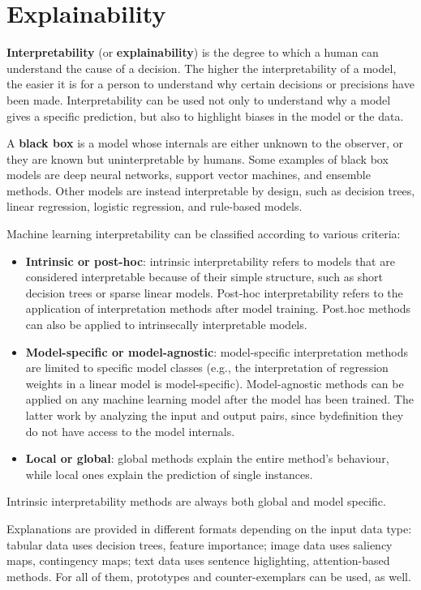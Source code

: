 \chapter{Explainability}

\textbf{Interpretability} (or \textbf{explainability}) is the degree to which a human can understand the cause of a decision. The higher the interpretability of a model, the easier it is for a person to understand why certain decisions or precisions have been made. Interpretability can be used not only to understand why a model gives a specific prediction, but also to highlight biases in the model or the data.

A \textbf{black box} is a model whose internals are either unknown to the observer, or they are known but uninterpretable by humans. Some examples of black box models are deep neural networks, support vector machines, and ensemble methods. Other models are instead interpretable by design, such as decision trees, linear regression, logistic regression, and rule-based models.

Machine learning interpretability can be classified according to various criteria:
\begin{itemize}
    \item \textbf{Intrinsic or post-hoc}: intrinsic interpretability refers to models that are considered interpretable because of their simple structure, such as short decision trees or sparse linear models. Post-hoc interpretability refers to the application of interpretation methods after model training. Post.hoc methods can also be applied to intrinsecally interpretable models.
    
    \item \textbf{Model-specific or model-agnostic}: model-specific interpretation methods are limited to specific model classes (e.g., the interpretation of regression weights in a linear model is model-specific). Model-agnostic methods can be applied on any machine learning model after the model has been trained. The latter work by analyzing the input and output pairs, since bydefinition they do not have access to the model internals.
    
    \item \textbf{Local or global}: global methods explain the entire method's behaviour, while local ones explain the prediction of single instances.
\end{itemize}
Intrinsic interpretability methods are always both global and model specific.

Explanations are provided in different formats depending on the input data type: tabular data uses decision trees, feature importance; image data uses saliency maps, contingency maps; text data uses sentence higlighting, attention-based methods. For all of them, prototypes and counter-exemplars can be used, as well.

